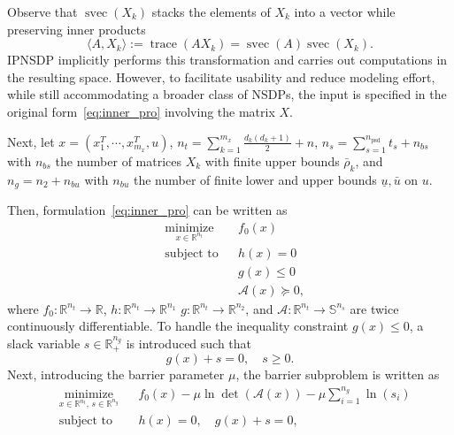 \documentclass[]{interact}
\theoremstyle{plain}%
\theoremstyle{definition}
\theoremstyle{remark}
\begin{document}
Observe that \(\operatorname{svec}(X_k)\)  stacks the elements of \( X_k \) into a vector while preserving inner products
\[\langle A, X_k \rangle := \operatorname{trace}(A  X_k) = \operatorname{svec}(A) \operatorname{svec}(X_k) .\]
IPNSDP implicitly performs this transformation and carries out computations in the resulting space. However, to facilitate usability and reduce modeling effort, while still accommodating a broader class of NSDPs, the input is specified in the original form~\eqref{eq:inner_pro} involving the matrix $X$.

Next, let $x = (x_1^T, \cdots, x_{m_x}^T, u)$, 
$n_t = \sum_{k=1}^{m_x} \tfrac{d_k(d_k+1)}{2} + n$, 
$n_s = \sum_{s=1}^{n_{\text{psd}}} t_s + n_{bs}$ with $n_{bs}$ the number of matrices $X_k$ with finite upper bounds $\bar{\rho}_k$, and 
$n_g = n_2 + n_{bu}$ with $n_{bu}$ the number of finite lower and upper bounds $\underline{u}, \bar{u}$ on $u$.

Then,  formulation~\eqref{eq:inner_pro} can be written as 
\begin{equation}\label{prob:nsdp_eq}
\begin{aligned}
& \underset{x \in \mathbb{R}^{n_t}}{\text{minimize}} & & f_0(x) \\
& \text{subject to} & & h(x) = 0 \\
& & & g(x) \leq 0\\
& & & \mathcal{A}(x) \succeq 0,
\end{aligned}
\end{equation}
where \( f_0 : \mathbb{R}^{n_t} \rightarrow \mathbb{R} \), \( h : \mathbb{R}^{n_t} \rightarrow \mathbb{R}^{n_{1}} \) \( g : \mathbb{R}^{n_t} \rightarrow \mathbb{R}^{n_2} \), and \( \mathcal{A} : \mathbb{R}^{n_t} \rightarrow \mathbb{S}^{n_s} \) are twice continuously differentiable. 
To handle the inequality constraint \( g(x) \leq 0 \), a slack variable \( s \in \mathbb{R}^{n_g}_+ \) is introduced such that
\[
g(x) + s = 0, \quad s \geq 0.
\]
Next, introducing the barrier parameter $\mu$, the barrier subproblem is written as
\begin{equation}\label{prob:barrier}
\begin{aligned}
& \underset{x \in \mathbb{R}^{n_t},\, s \in \mathbb{R}^{n_g}}{\text{minimize}} & & f_0(x) - \mu \ln\det(\mathcal{A}(x)) - \mu \sum_{i=1}^{n_g} \ln(s_i) \\
& \text{subject to} & & h(x) = 0, \quad g(x) + s = 0,
\end{aligned}
\end{equation}
\end{document}
